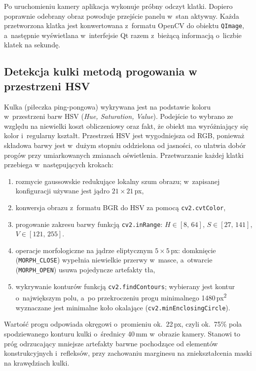 Po uruchomieniu kamery aplikacja wykonuje próbny odczyt klatki. Dopiero poprawnie
odebrany obraz powoduje przejście panelu w~stan aktywny. Każda przetworzona klatka
jest konwertowana z~formatu OpenCV do obiektu \texttt{QImage}, a~następnie
wyświetlana w~interfejsie Qt razem z~bieżącą informacją o~liczbie klatek na sekundę.

\subsection{Detekcja kulki metodą progowania w przestrzeni HSV}

Kulka (piłeczka ping-pongowa) wykrywana jest na podstawie koloru
w~przestrzeni barw HSV (\emph{Hue, Saturation, Value}).
Podejście to wybrano ze względu na niewielki koszt obliczeniowy oraz fakt, że
obiekt ma wyróżniający się kolor i~regularny kształt. Przestrzeń HSV jest
wygodniejsza od RGB, ponieważ składowa barwy jest w~dużym stopniu oddzielona od
jasności, co ułatwia dobór progów przy umiarkowanych zmianach oświetlenia.
Przetwarzanie każdej klatki przebiega w~następujących krokach:

\begin{enumerate}
  \item rozmycie gaussowskie redukujące lokalny szum obrazu; w~zapisanej
        konfiguracji używane jest jądro $21\times21$\,px,
  \item konwersja obrazu z~formatu BGR do HSV za pomocą \texttt{cv2.cvtColor},
  \item progowanie zakresu barwy funkcją \texttt{cv2.inRange}:
        $H \in [8,\,64]$, $S \in [27,\,141]$, $V \in [121,\,255]$.
  \item operacje morfologiczne na jądrze eliptycznym $5\times5$\,px: domknięcie
        (\texttt{MORPH\_CLOSE}) wypełnia niewielkie przerwy w~masce, a~otwarcie
        (\texttt{MORPH\_OPEN}) usuwa pojedyncze artefakty tła,
  \item wykrywanie konturów funkcją \texttt{cv2.findContours}; wybierany jest
        kontur o~największym polu, a~po przekroczeniu progu minimalnego
        1480\,px\textsuperscript{2} wyznaczane jest minimalne koło okalające
        (\texttt{cv2.minEnclosingCircle}).
\end{enumerate}

Wartość progu odpowiada okręgowi o~promieniu ok.~22\,px, czyli ok.~75\% pola
spodziewanego konturu kulki o~średnicy 40\,mm w~obrazie kamery. Stanowi to próg
odrzucający mniejsze artefakty barwne pochodzące od elementów konstrukcyjnych
i~refleksów, przy zachowaniu marginesu na zniekształcenia maski na krawędziach
kulki.

